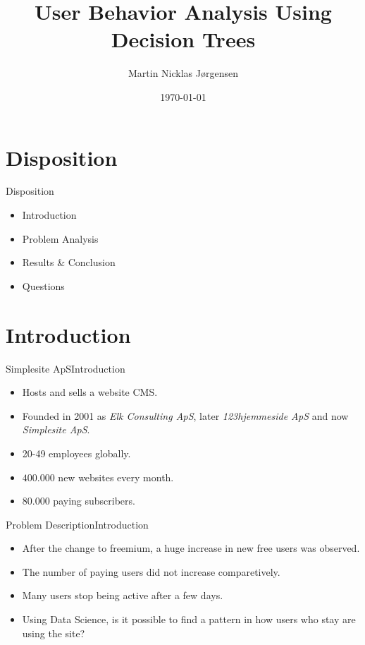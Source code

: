 \documentclass[12pt,aspectratio=1610]{beamer}
\title[Company Project]{User Behavior Analysis Using Decision Trees}
\author{Martin Nicklas Jørgensen}
\institute{Department of Computer Science}
\date{\today}
\begin{document}
\frame[plain]{\titlepage}

\section{Disposition}
\begin{frame}{Disposition}
	\begin{itemize}[<+->]
		\item Introduction 
		\item Problem Analysis
		\item Results \& Conclusion
		\item Questions
	\end{itemize}
\end{frame}

\section{Introduction}

\begin{frame}{Simplesite ApS}{Introduction}
	\begin{itemize}
		\item Hosts and sells a website CMS.
		\item Founded in 2001 as \textit{Elk Consulting ApS}, later \textit{123hjemmeside ApS} and now \textit{Simplesite ApS}.
		\item 20-49 employees globally.
		\item $400.000$ new websites every month.
		\item $80.000$ paying subscribers.
	\end{itemize}
\end{frame}

\begin{frame}{Problem Description}{Introduction}
	\begin{itemize}
		\item After the change to freemium, a huge increase in new free users was observed.
		\item The number of paying users did not increase comparetively.
		\item Many users stop being active after a few days.
		\item Using Data Science, is it possible to find a pattern in how users who stay are using the site?
	\end{itemize}
\end{frame}
\end{document}
